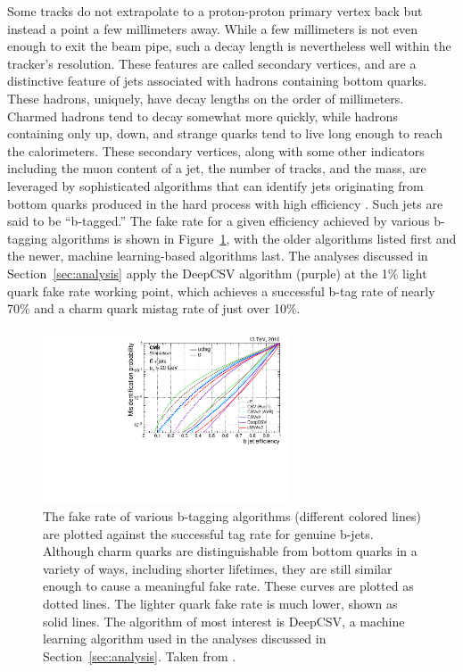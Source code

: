     Some tracks do not extrapolate to a proton-proton primary vertex back but instead a point a few millimeters away.
    While a few millimeters is not even enough to exit the beam pipe, such a decay length is nevertheless well within the tracker's resolution.
    These features are called secondary vertices, and are a distinctive feature of jets associated with hadrons containing bottom quarks.
    These hadrons, uniquely, have decay lengths on the order of millimeters.
    Charmed hadrons tend to decay somewhat more quickly, while hadrons containing only up, down, and strange quarks tend to live long enough to reach the calorimeters.
    These secondary vertices, along with some other indicators including the muon content of a jet, the number of tracks, and the mass, are leveraged by sophisticated algorithms that can identify jets originating from bottom quarks produced in the hard process with high efficiency \cite{btagging}.
    Such jets are said to be ``b-tagged.''
    The fake rate for a given efficiency achieved by various b-tagging algorithms is shown in Figure~\ref{fig:btageff}, with the older algorithms listed first and the newer, machine learning-based algorithms last.
    The analyses discussed in Section~\ref{sec:analysis} apply the DeepCSV algorithm (purple) at the 1\% light quark fake rate working point, which achieves a successful b-tag rate of nearly 70\% and a charm quark mistag rate of just over 10\%.

  \begin{figure}[h!]
    \centering
    \includegraphics[width=0.65\textwidth]{figures/btageff.pdf}
    \caption[Efficiency and fake-rates of various b-tagging algorithms.]{
      The fake rate of various b-tagging algorithms (different colored lines) are plotted against the successful tag rate for genuine b-jets.
      Although charm quarks are distinguishable from bottom quarks in a variety of ways, including shorter lifetimes, they are still similar enough to cause a meaningful fake rate.
      These curves are plotted as dotted lines.
      The lighter quark fake rate is much lower, shown as solid lines.
      The algorithm of most interest is DeepCSV, a machine learning algorithm used in the analyses discussed in Section~\ref{sec:analysis}.
      Taken from \cite{btagging}.}
    \label{fig:btageff}
  \end{figure}  

